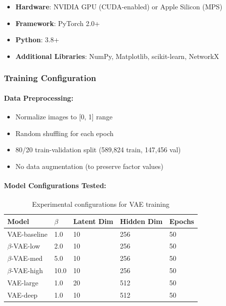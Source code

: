 \documentclass[conference]{IEEEtran}
\begin{document}
\begin{itemize}
    \item \textbf{Hardware}: NVIDIA GPU (CUDA-enabled) or Apple Silicon (MPS)
    \item \textbf{Framework}: PyTorch 2.0+
    \item \textbf{Python}: 3.8+
    \item \textbf{Additional Libraries}: NumPy, Matplotlib, scikit-learn, NetworkX
\end{itemize}

\subsubsection{Training Configuration}

\paragraph{Data Preprocessing:}
\begin{itemize}
    \item Normalize images to [0, 1] range
    \item Random shuffling for each epoch
    \item 80/20 train-validation split (589,824 train, 147,456 val)
    \item No data augmentation (to preserve factor values)
\end{itemize}

\paragraph{Model Configurations Tested:}
\begin{table}[H]
\centering
\begin{tabular}{@{}lllll@{}}
\toprule
\textbf{Model} & \textbf{$\beta$} & \textbf{Latent Dim} & \textbf{Hidden Dim} & \textbf{Epochs} \\ \midrule
VAE-baseline & 1.0 & 10 & 256 & 50 \\
$\beta$-VAE-low & 2.0 & 10 & 256 & 50 \\
$\beta$-VAE-med & 5.0 & 10 & 256 & 50 \\
$\beta$-VAE-high & 10.0 & 10 & 256 & 50 \\
VAE-large & 1.0 & 20 & 512 & 50 \\
VAE-deep & 1.0 & 10 & 512 & 50 \\ \bottomrule
\end{tabular}
\caption{Experimental configurations for VAE training}
\label{tab:experiments}
\end{table}
\end{document}
